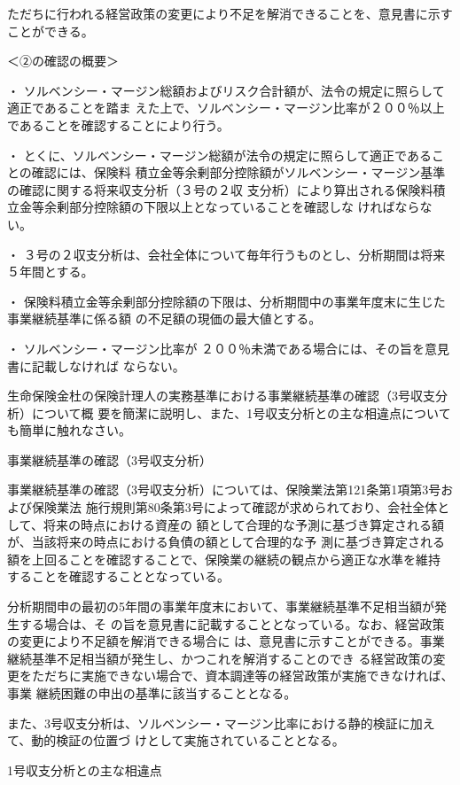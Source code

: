 \documentclass[report,gutter=10mm,fore-edge=10mm,uplatex,dvipdfmx]{jlreq}
\begin{document}
ただちに行われる経営政策の変更により不足を解消できることを、意見書に示すことができる。

＜②の確認の概要＞

・ ソルベンシー・マージン総額およびリスク合計額が、法令の規定に照らして適正であることを踏ま
えた上で、ソルベンシー・マージン比率が２００％以上であることを確認することにより行う。

・ とくに、ソルベンシー・マージン総額が法令の規定に照らして適正であることの確認には、保険料
積立金等余剰部分控除額がソルベンシー・マージン基準の確認に関する将来収支分析（３号の２収
支分析）により算出される保険料積立金等余剰部分控除額の下限以上となっていることを確認しな
ければならない。

・ ３号の２収支分析は、会社全体について毎年行うものとし、分析期間は将来５年間とする。

・ 保険料積立金等余剰部分控除額の下限は、分析期間中の事業年度末に生じた事業継続基準に係る額
の不足額の現価の最大値とする。

・ ソルベンシー・マージン比率が ２００％未満である場合には、その旨を意見書に記載しなければ
ならない。

生命保険金杜の保険計理人の実務基準における事業継続基準の確認（3号収支分析）について概
要を簡潔に説明し、また、1号収支分析との主な相違点についても簡単に触れなさい。

\answer{}
事業継続基準の確認（3号収支分析）

事業継続基準の確認（3号収支分析）については、保険業法第121条第1項第3号および保険業法
施行規則第80条第3号によって確認が求められており、会社全体として、将来の時点における資産の
額として合理的な予測に基づき算定される額が、当該将来の時点における負債の額として合理的な予
測に基づき算定される額を上回ることを確認することで、保険業の継続の観点から適正な水準を維持
することを確認することとなっている。

分析期間申の最初の5年間の事業年度末において、事業継続基準不足相当額が発生する場合は、そ
の旨を意見書に記載することとなっている。なお、経営政策の変更により不足額を解消できる場合に
は、意見書に示すことができる。事業継続基準不足相当額が発生し、かつこれを解消することのでき
る経営政策の変更をただちに実施できない場合で、資本調達等の経営政策が実施できなければ、事業
継続困難の申出の基準に該当することとなる。

また、3号収支分析は、ソルベンシー・マージン比率における静的検証に加えて、動的検証の位置づ
けとして実施されていることとなる。

1号収支分析との主な相違点
\end{document}
